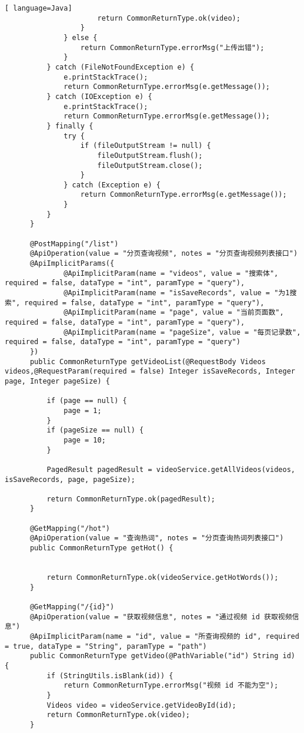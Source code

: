 \begin{lstlisting}[ language=Java]
                      return CommonReturnType.ok(video);
                  }
              } else {
                  return CommonReturnType.errorMsg("上传出错");
              }
          } catch (FileNotFoundException e) {
              e.printStackTrace();
              return CommonReturnType.errorMsg(e.getMessage());
          } catch (IOException e) {
              e.printStackTrace();
              return CommonReturnType.errorMsg(e.getMessage());
          } finally {
              try {
                  if (fileOutputStream != null) {
                      fileOutputStream.flush();
                      fileOutputStream.close();
                  }
              } catch (Exception e) {
                  return CommonReturnType.errorMsg(e.getMessage());
              }
          }
      }
  
      @PostMapping("/list")
      @ApiOperation(value = "分页查询视频", notes = "分页查询视频列表接口")
      @ApiImplicitParams({
              @ApiImplicitParam(name = "videos", value = "搜索体", required = false, dataType = "int", paramType = "query"),
              @ApiImplicitParam(name = "isSaveRecords", value = "为1搜索", required = false, dataType = "int", paramType = "query"),
              @ApiImplicitParam(name = "page", value = "当前页面数", required = false, dataType = "int", paramType = "query"),
              @ApiImplicitParam(name = "pageSize", value = "每页记录数", required = false, dataType = "int", paramType = "query")
      })
      public CommonReturnType getVideoList(@RequestBody Videos videos,@RequestParam(required = false) Integer isSaveRecords, Integer page, Integer pageSize) {
  
          if (page == null) {
              page = 1;
          }
          if (pageSize == null) {
              page = 10;
          }
  
          PagedResult pagedResult = videoService.getAllVideos(videos, isSaveRecords, page, pageSize);
  
          return CommonReturnType.ok(pagedResult);
      }
  
      @GetMapping("/hot")
      @ApiOperation(value = "查询热词", notes = "分页查询热词列表接口")
      public CommonReturnType getHot() {
  
  
          return CommonReturnType.ok(videoService.getHotWords());
      }
  
      @GetMapping("/{id}")
      @ApiOperation(value = "获取视频信息", notes = "通过视频 id 获取视频信息")
      @ApiImplicitParam(name = "id", value = "所查询视频的 id", required = true, dataType = "String", paramType = "path")
      public CommonReturnType getVideo(@PathVariable("id") String id) {
          if (StringUtils.isBlank(id)) {
              return CommonReturnType.errorMsg("视频 id 不能为空");
          }
          Videos video = videoService.getVideoById(id);
          return CommonReturnType.ok(video);
      }
  

\end{lstlisting}

